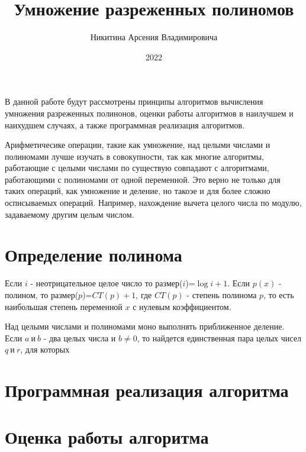 \documentclass[bachelor, och, labwork]{shiza}
\begin{document}

\title{Умножение разреженных полиномов}





\author{Никитина Арсения Владимировича}



\date{2022}

\maketitle

\tableofcontents

\intro
В данной работе будут рассмотрены принципы алгоритмов вычисления умножения 
разреженных полинонов, оценки работы алгоритмов в наилучшем и наихудшем случаях,
а также программная реализация алгоритмов. 

Арифметичесике операции, такие как умножение, над целыми числами и полиномами
лучше изучать в совокупности, так как многие алгоритмы, работающие с целыми 
числами по существую совпадают с алгоритмами, работающими с полиномами от одной
переменной. Это верно не только для таких операций, как умножение и деление, но
такоэе и для более сложно осписываемых операций. Например, нахождение вычета
целого числа по модулю, задаваемому другим целым числом.


\section{Определение полинома}

Если $i$ - неотрицательное целое число то размер($i$)=$\log i + 1$. Если $p(x)$
- полином, то размер($p$)=$CT(p) + 1$, где $CT(p)$ - степень полинома $p$, то
есть наибольшая степень переменной $x$ с нулевым коэффициентом.

Над целыми числами и полиномами моно выполнять приближенное деление. Если 
$a ~\text{и}~ b$ - два целых числа и $b \not= 0$, то найдется единственная пара
целых чисел $q ~\text{и}~ r$, для которых


\section{Программная реализация алгоритма}


\section{Оценка работы алгоритма}


\conclusion
\end{document}
